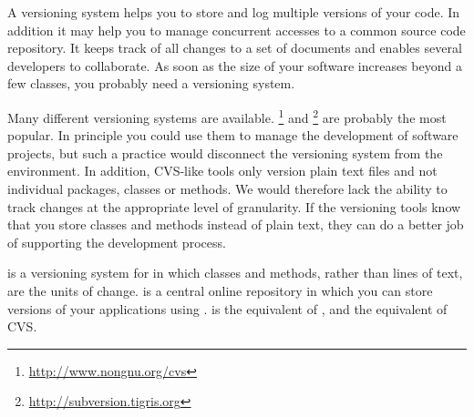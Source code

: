 \documentclass[a4paper,10pt,twoside]{book}
\begin{document}

A versioning system helps you to store and log multiple versions of your code. In addition it may help you to manage concurrent accesses to a common source code repository. It keeps track of all changes to a set of documents and enables several developers to collaborate. As soon as the size of your software increases beyond a few classes, you probably need a versioning system.

Many different versioning systems are available. \footnote{\url{http://www.nongnu.org/cvs}} and \footnote{\url{http://subversion.tigris.org}} are probably the most popular.
In principle you could use them to manage the development of \pharo software projects, but such a practice would disconnect the versioning system from the \pharo environment.
In addition, CVS-like tools only version plain text files and not individual packages, classes or methods. We would therefore lack the ability to track changes at the appropriate level of granularity. 
If the versioning tools know that you store classes and methods instead of plain text,
they can do a better job of supporting the development process.


\emph{\indmain{\MC{}}} is  a versioning system for \pharo in which classes and methods, rather than lines of text,
are the units of change. \emph{\sqsrc{}} is a central online repository in which you can store versions of your applications using \MC. \sqsrc is the equivalent of , and \MC the equivalent of CVS. 
\end{document}
